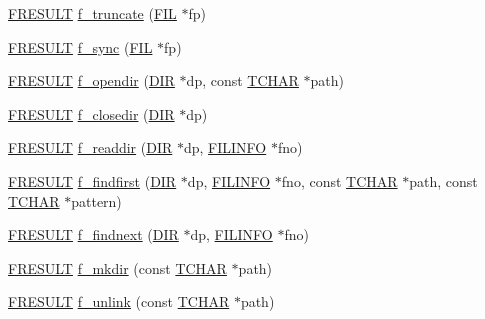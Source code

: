 \begin{DoxyCompactItemize}
\item 
\hyperlink{ff_8h_a49d0171ecbd362cda5680a0d360db44c}{F\+R\+E\+S\+U\+L\+T} \hyperlink{ff_8h_a691a27b40c348f7c84b42e911636f38a}{f\+\_\+truncate} (\hyperlink{struct_f_i_l}{F\+I\+L} $\ast$fp)
\item 
\hyperlink{ff_8h_a49d0171ecbd362cda5680a0d360db44c}{F\+R\+E\+S\+U\+L\+T} \hyperlink{ff_8h_ad69c7246b122ba56a134939ee0eaf847}{f\+\_\+sync} (\hyperlink{struct_f_i_l}{F\+I\+L} $\ast$fp)
\item 
\hyperlink{ff_8h_a49d0171ecbd362cda5680a0d360db44c}{F\+R\+E\+S\+U\+L\+T} \hyperlink{ff_8h_ab63b213c75f7335fbb63a1f3f70e5fc7}{f\+\_\+opendir} (\hyperlink{struct_d_i_r}{D\+I\+R} $\ast$dp, const \hyperlink{ff_8h_a03bdb8ce5895c7e261aadc2529637546}{T\+C\+H\+A\+R} $\ast$path)
\item 
\hyperlink{ff_8h_a49d0171ecbd362cda5680a0d360db44c}{F\+R\+E\+S\+U\+L\+T} \hyperlink{ff_8h_ab5f7376b6f3e3bcc7f5ff5497c8b7364}{f\+\_\+closedir} (\hyperlink{struct_d_i_r}{D\+I\+R} $\ast$dp)
\item 
\hyperlink{ff_8h_a49d0171ecbd362cda5680a0d360db44c}{F\+R\+E\+S\+U\+L\+T} \hyperlink{ff_8h_ab39e82a110695de45f416f3149358012}{f\+\_\+readdir} (\hyperlink{struct_d_i_r}{D\+I\+R} $\ast$dp, \hyperlink{struct_f_i_l_i_n_f_o}{F\+I\+L\+I\+N\+F\+O} $\ast$fno)
\item 
\hyperlink{ff_8h_a49d0171ecbd362cda5680a0d360db44c}{F\+R\+E\+S\+U\+L\+T} \hyperlink{ff_8h_a6db7bc3d037b51a9f205eacda6177a5f}{f\+\_\+findfirst} (\hyperlink{struct_d_i_r}{D\+I\+R} $\ast$dp, \hyperlink{struct_f_i_l_i_n_f_o}{F\+I\+L\+I\+N\+F\+O} $\ast$fno, const \hyperlink{ff_8h_a03bdb8ce5895c7e261aadc2529637546}{T\+C\+H\+A\+R} $\ast$path, const \hyperlink{ff_8h_a03bdb8ce5895c7e261aadc2529637546}{T\+C\+H\+A\+R} $\ast$pattern)
\item 
\hyperlink{ff_8h_a49d0171ecbd362cda5680a0d360db44c}{F\+R\+E\+S\+U\+L\+T} \hyperlink{ff_8h_a013999e446481a607316b916441f8673}{f\+\_\+findnext} (\hyperlink{struct_d_i_r}{D\+I\+R} $\ast$dp, \hyperlink{struct_f_i_l_i_n_f_o}{F\+I\+L\+I\+N\+F\+O} $\ast$fno)
\item 
\hyperlink{ff_8h_a49d0171ecbd362cda5680a0d360db44c}{F\+R\+E\+S\+U\+L\+T} \hyperlink{ff_8h_a4b4d38db58e89c526cfcf53200d719d0}{f\+\_\+mkdir} (const \hyperlink{ff_8h_a03bdb8ce5895c7e261aadc2529637546}{T\+C\+H\+A\+R} $\ast$path)
\item 
\hyperlink{ff_8h_a49d0171ecbd362cda5680a0d360db44c}{F\+R\+E\+S\+U\+L\+T} \hyperlink{ff_8h_a2858167fcd0bced48e9be434b3895efe}{f\+\_\+unlink} (const \hyperlink{ff_8h_a03bdb8ce5895c7e261aadc2529637546}{T\+C\+H\+A\+R} $\ast$path)

\end{DoxyCompactItemize}
